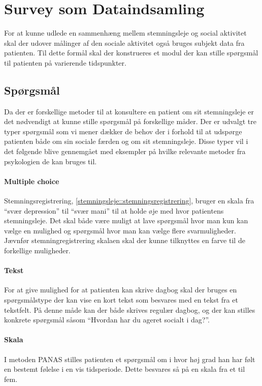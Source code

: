 \section{Survey som Dataindsamling}
For at kunne udlede en sammenhæng mellem stemningsleje og social aktivitet skal der udover målinger af den sociale aktivitet også bruges subjekt data fra patienten.
Til dette formål skal der konstrueres et modul der kan stille spørgsmål til patienten på varierende tidspunkter.

\subsection{Spørgsmål}\label{survey:spg}
Da der er forskellige metoder til at konsultere en patient om sit stemningsleje er det nødvendigt at kunne stille spørgsmål på forskellige måder.
Der er udvalgt tre typer spørgsmål som vi mener dækker de behov der i forhold til at udspørge patienten både om sin sociale færden og om sit stemningsleje.
Disse typer vil i det følgende blive gennemgået med eksempler på hvilke relevante metoder fra psykologien de kan bruges til.

\paragraph{Multiple choice}
Stemningsregistrering, \cref{stemningsleje::stemningsregistrering}, bruger en skala fra ``svær depression'' til ``svær mani'' til at holde øje med hvor patientens stemningsleje.
Det skal både være muligt at lave spørgsmål hvor man kun kan vælge en mulighed og spørgsmål hvor man kan vælge flere svarmuligheder.
Jævnfør stemningregistrering skalaen skal der kunne tilknyttes en farve til de forkellige muligheder.


\paragraph{Tekst}
For at give mulighed for at patienten kan skrive dagbog  skal der bruges en spørgsmålstype der kan vise en kort tekst som besvares med en tekst fra et tekstfelt.
På denne måde kan der både skrives regulær dagbog, og der kan stilles konkrete spørgsmål såsom ``Hvordan har du ageret socialt i dag?''.

\paragraph{Skala}
I metoden PANAS stilles patienten et spørgsmål om i hvor høj grad han har følt en bestemt følelse i en vis tidsperiode.
Dette besvares så på en skala fra et til fem.

